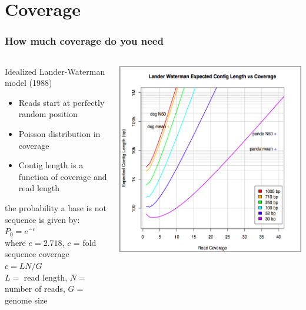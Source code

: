 \documentclass[pdf]{beamer}
\begin{document}
\section{Coverage}
\begin{frame}
\frametitle{How much coverage do you need}
\begin{columns}[t] %
\begin{column}[T]{6cm} %
    Idealized Lander-Waterman model (1988)
    \begin{footnotesize}
    \begin{itemize}
    \item Reads start at perfectly random position
    \item Poisson distribution in coverage
    \item Contig length is a function of coverage and read length
    \end{itemize}
	\end{footnotesize}
the probability a base is not sequence is given by: $P_0 = e^{-c}$\\
where $e = 2.718$, $c$ = fold sequence coverage\\
$c = LN/G$\\
$L = $ read length, $N = $ number of reads, $G = $ genome size
\end{column}
\begin{column}[T]{4cm} %
\begin{center}
\includegraphics[scale=0.20]{Figures/coverage.png} 
\end{center}
\end{column}
\end{columns}
\end{frame}
\end{document}
